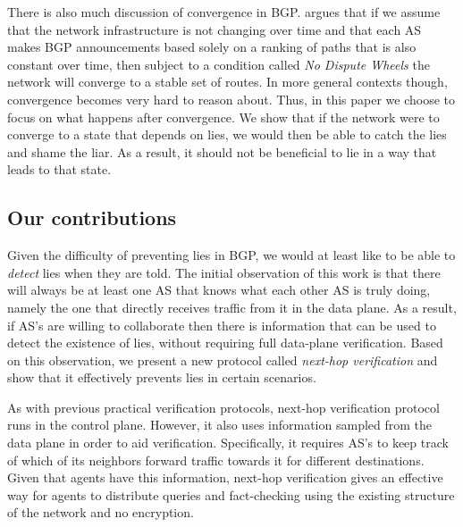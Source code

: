 \documentclass[10pt]{article}
\begin{document}
    There is also much discussion of convergence in BGP. \cite{RoutingGames}
    argues that if we assume that the network infrastructure is not changing
    over time and that each AS makes BGP announcements based solely on a ranking
    of paths that is also constant over time, then subject to a condition called
    \emph{No Dispute Wheels} the network will converge to a stable set of
    routes. In more general contexts though, convergence becomes very hard to
    reason about. Thus, in this paper we choose to focus on what happens after
    convergence. We show that if the network were to converge to a state that
    depends on lies, we would then be able to catch the lies and shame the liar.
    As a result, it should not be beneficial to lie in a way that leads to that
    state.

  \subsection{Our contributions}
    Given the difficulty of preventing lies in BGP,
    we would at least like to be able to \emph{detect} lies when they are told.
    The initial observation of this work is that
    there will always be at least one AS that knows what each
    other AS is truly doing, namely the one that directly receives traffic from
    it in the data plane.
    As a result, if AS's are willing to collaborate then there is
    information that can be used to detect the existence of lies, without
    requiring full data-plane verification.
    Based on this observation, we present a new protocol called
    \emph{next-hop verification}
    and show that it effectively prevents lies in certain scenarios.

    As with previous practical verification protocols,
    next-hop verification protocol runs in the control plane.
    However, it also uses
    information sampled from the data plane in order to aid verification.
    Specifically, it requires AS's to keep track of which of its neighbors
    forward traffic towards it for different destinations.
    Given that agents have this information, next-hop verification gives an
    effective way for agents to distribute queries and fact-checking
    using the existing structure of the network and no encryption.
\end{document}
